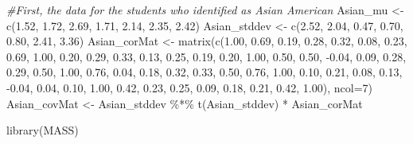 \documentclass[
  english,
]{book}
\newenvironment{Shaded}{\begin{snugshade}}{\end{snugshade}}
\newcommand{\AttributeTok}[1]{\textcolor[rgb]{0.77,0.63,0.00}{#1}}
\newcommand{\CommentTok}[1]{\textcolor[rgb]{0.56,0.35,0.01}{\textit{#1}}}
\newcommand{\DecValTok}[1]{\textcolor[rgb]{0.00,0.00,0.81}{#1}}
\newcommand{\FloatTok}[1]{\textcolor[rgb]{0.00,0.00,0.81}{#1}}
\newcommand{\FunctionTok}[1]{\textcolor[rgb]{0.00,0.00,0.00}{#1}}
\newcommand{\NormalTok}[1]{#1}
\newcommand{\OtherTok}[1]{\textcolor[rgb]{0.56,0.35,0.01}{#1}}
\newcommand{\SpecialCharTok}[1]{\textcolor[rgb]{0.00,0.00,0.00}{#1}}
\begin{document}
\begin{Shaded}
\begin{Highlighting}[]
\CommentTok{\#First, the data for the students who identified as Asian American}
\NormalTok{Asian\_mu }\OtherTok{\textless{}{-}} \FunctionTok{c}\NormalTok{(}\FloatTok{1.52}\NormalTok{, }\FloatTok{1.72}\NormalTok{, }\FloatTok{2.69}\NormalTok{, }\FloatTok{1.71}\NormalTok{, }\FloatTok{2.14}\NormalTok{, }\FloatTok{2.35}\NormalTok{, }\FloatTok{2.42}\NormalTok{)}
\NormalTok{Asian\_stddev }\OtherTok{\textless{}{-}} \FunctionTok{c}\NormalTok{(}\FloatTok{2.52}\NormalTok{, }\FloatTok{2.04}\NormalTok{, }\FloatTok{0.47}\NormalTok{, }\FloatTok{0.70}\NormalTok{, }\FloatTok{0.80}\NormalTok{, }\FloatTok{2.41}\NormalTok{, }\FloatTok{3.36}\NormalTok{)}
\NormalTok{Asian\_corMat }\OtherTok{\textless{}{-}} \FunctionTok{matrix}\NormalTok{(}\FunctionTok{c}\NormalTok{(}\FloatTok{1.00}\NormalTok{,  }\FloatTok{0.69}\NormalTok{,  }\FloatTok{0.19}\NormalTok{,  }\FloatTok{0.28}\NormalTok{,  }\FloatTok{0.32}\NormalTok{,  }\FloatTok{0.08}\NormalTok{,  }\FloatTok{0.23}\NormalTok{,}
                          \FloatTok{0.69}\NormalTok{,  }\FloatTok{1.00}\NormalTok{,  }\FloatTok{0.20}\NormalTok{,  }\FloatTok{0.29}\NormalTok{,  }\FloatTok{0.33}\NormalTok{,  }\FloatTok{0.13}\NormalTok{,  }\FloatTok{0.25}\NormalTok{,}
                          \FloatTok{0.19}\NormalTok{,  }\FloatTok{0.20}\NormalTok{,  }\FloatTok{1.00}\NormalTok{,  }\FloatTok{0.50}\NormalTok{,  }\FloatTok{0.50}\NormalTok{, }\SpecialCharTok{{-}}\FloatTok{0.04}\NormalTok{,  }\FloatTok{0.09}\NormalTok{,}
                          \FloatTok{0.28}\NormalTok{,  }\FloatTok{0.29}\NormalTok{,  }\FloatTok{0.50}\NormalTok{,  }\FloatTok{1.00}\NormalTok{,  }\FloatTok{0.76}\NormalTok{,  }\FloatTok{0.04}\NormalTok{,  }\FloatTok{0.18}\NormalTok{,}
                          \FloatTok{0.32}\NormalTok{,  }\FloatTok{0.33}\NormalTok{,  }\FloatTok{0.50}\NormalTok{,  }\FloatTok{0.76}\NormalTok{,  }\FloatTok{1.00}\NormalTok{,  }\FloatTok{0.10}\NormalTok{,  }\FloatTok{0.21}\NormalTok{,}
                          \FloatTok{0.08}\NormalTok{,  }\FloatTok{0.13}\NormalTok{, }\SpecialCharTok{{-}}\FloatTok{0.04}\NormalTok{,  }\FloatTok{0.04}\NormalTok{,  }\FloatTok{0.10}\NormalTok{,  }\FloatTok{1.00}\NormalTok{,  }\FloatTok{0.42}\NormalTok{,}
                          \FloatTok{0.23}\NormalTok{,  }\FloatTok{0.25}\NormalTok{,  }\FloatTok{0.09}\NormalTok{,  }\FloatTok{0.18}\NormalTok{,  }\FloatTok{0.21}\NormalTok{,  }\FloatTok{0.42}\NormalTok{,  }\FloatTok{1.00}\NormalTok{),}
                        \AttributeTok{ncol=}\DecValTok{7}\NormalTok{)}
\NormalTok{Asian\_covMat }\OtherTok{\textless{}{-}}\NormalTok{ Asian\_stddev }\SpecialCharTok{\%*\%} \FunctionTok{t}\NormalTok{(Asian\_stddev) }\SpecialCharTok{*}\NormalTok{ Asian\_corMat}

\FunctionTok{library}\NormalTok{(MASS)}
\end{Highlighting}
\end{Shaded}
\end{document}
